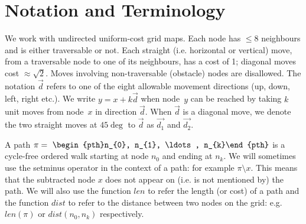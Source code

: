 \section{Notation and Terminology}
\label{sec:notation}
We work with undirected uniform-cost grid maps.  Each node has $\leq 8$
neighbours and is either traversable or not.  Each straight (i.e. horizontal or vertical) move,
from a traversable node to one of its neighbours, has a cost of 1; diagonal
moves cost $\approx\sqrt 2$.  Moves involving non-traversable (obstacle) nodes
are disallowed.  The notation $\vec{d}$ refers to one of the eight allowable
movement directions (up, down, left, right etc.).  We write $y = x + k\vec{d}$
when node~$y$ can be reached by taking $k$ unit moves from node~$x$ in direction
$\vec{d}$.  When $\vec{d}$ is a diagonal move, we denote the two
straight moves at $45\deg$ to $\vec{d}$ as $\vec{d_1}$ and
$\vec{d_2}$.

A path $\pi =~\begin{pth}n_{0}, n_{1}, \ldots , n_{k}\end{pth}$ is a cycle-free
ordered walk starting at node $n_{0}$ and ending at $n_{k}$.  We will sometimes
use the setminus operator in the context of a path: for example $\pi \setminus
x$. This means that the subtracted node $x$ does not appear on (i.e. is not
mentioned by) the path.  We will also use the function $len$ to refer the length
(or cost) of a path and the function $dist$ to refer to the distance between two
nodes on the grid: e.g. $len(\pi)$ or $dist(n_{0}, n_{k})$ respectively.  



